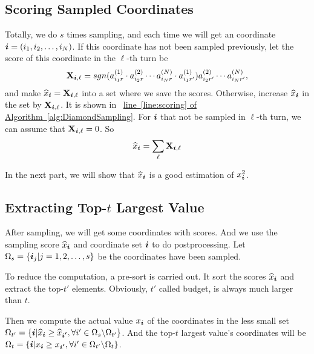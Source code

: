 \documentclass[letterpaper]{article}
\newcommand{\Sca}[3]{{#1}^{(#2)}_{i_#2#3}}%
\newcommand{\V}[1]{{\bm{{\MakeLowercase{#1}}}}}
\newcommand{\M}[1]{{\bm{\mathbf{\MakeUppercase{#1}}}}}
\newcommand{\AlgLine}[2]{\hyperref[alg:#1]{line~\ref*{line:#2} of Algorithm~\ref*{alg:#1}}}
\newcommand{\Coord}{(i_1,i_2,\ldots,i_N)}
\begin{document}
\subsection{Scoring Sampled Coordinates}

Totally, we do $s$ times sampling, and each time we will get an coordinate $\V{i} =\Coord$.
If this coordinate has not been sampled previously, let the score of this coordinate in the $\ell$-th turn be
\[
\M{X}_{\V{i},\ell}  = sgn(\Sca{a}{1}{r}\cdot\Sca{a}{2}{r}\cdots\Sca{a}{N}{r}\cdot\Sca{a}{1}{r'}) \Sca{a}{2}{r'}\cdots\Sca{a}{N}{r'},
\]
and make $\widehat{x}_{\V{i}} = \M{X}_{\V{i},\ell}$ into a set where we save the scores. Otherwise, increase $\widehat{x}_{\V{i}}$ in the set by $\M{X}_{\V{i},\ell}$. It is shown in ~\AlgLine{DiamondSampling}{scoring}. For $\V{i}$ that not be sampled in $\ell$-th turn, we can assume that $\M{X}_{\V{i},\ell}=0$. So
\[
\widehat{x}_{\V{i}} = \sum_{\ell} \M{X}_{\V{i},\ell}
\]

In the next part, we will show that $\widehat{x}_{\V{i}}$ is a good estimation of $x_{\V{i}}^2$.

\subsection{Extracting Top-$t$ Largest Value}
After sampling, we will get some coordinates with scores.
And we use the sampling score $\widehat{x}_{\V{i}}$ and coordinate set $\V{i}$ to do postprocessing.
Let $\Omega_s = \{\V{i}_j|j = 1,2,\ldots,s\}$ be the coordinates have been sampled.

To reduce the computation, a pre-sort is carried out. It sort the scores $\widehat{x}_{\V{i}}$ and extract the top-$t'$ elements.
Obviously, $t'$ called budget, is always much larger than $t$.

Then we compute the actual value $x_{\V{i}}$ of the coordinates in the less small set $\Omega_{t'} = \{\V{i}|\widehat{x}_{\V{i}}\geq \widehat{x}_{\V{i'}},\forall i'\in \Omega_{s} \backslash \Omega_{t'}\}$. And the top-$t$ largest value's coordinates will be $\Omega_{t}=\{\V{i}|x_{\V{i}}\geq x_{\V{i'}},\forall i' \in \Omega_{t'} \backslash \Omega_{t} \}$.
\end{document}
